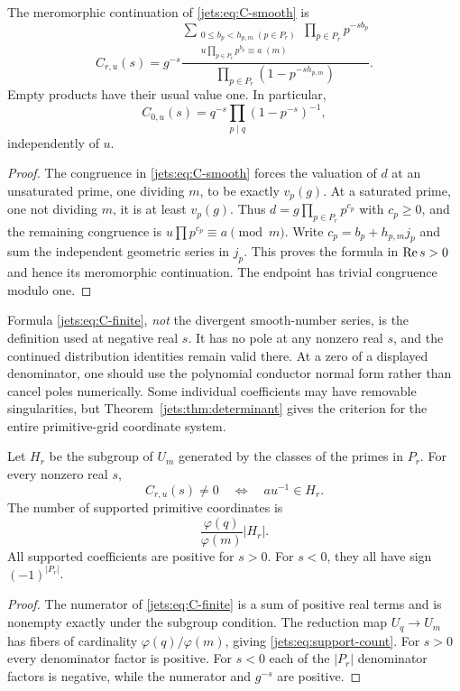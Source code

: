 \begin{theorem}\label{jets:thm:finite-C}
The meromorphic continuation of \eqref{jets:eq:C-smooth} is
\begin{equation}\label{jets:eq:C-finite}
 C_{r,u}(s)=g^{-s}
 \frac{\displaystyle
 \sum_{\substack{0\le b_p<h_{p,m}\;(p\in P_r)\\
 u\prod_{p\in P_r}p^{b_p}\equiv a\;(m)}}
 \prod_{p\in P_r}p^{-s b_p}}
 {\displaystyle\prod_{p\in P_r}(1-p^{-s h_{p,m}})}.
\end{equation}
Empty products have their usual value one. In particular,
\begin{equation}\label{jets:eq:C-endpoint}
 C_{0,u}(s)=q^{-s}\prod_{p\mid q}(1-p^{-s})^{-1},
\end{equation}
independently of $u$.
\end{theorem}
\begin{proof}
The congruence in \eqref{jets:eq:C-smooth} forces the valuation of $d$ at
an unsaturated prime, one dividing $m$, to be exactly $v_p(g)$.
At a saturated prime, one not dividing $m$, it is at least $v_p(g)$.
Thus $d=g\prod_{p\in P_r}p^{c_p}$ with $c_p\ge0$, and the remaining
congruence is $u\prod p^{c_p}\equiv a\pmod m$.
Write $c_p=b_p+h_{p,m}j_p$ and sum the independent geometric series in
$j_p$. This proves the formula in $\operatorname{Re} s>0$ and hence its meromorphic
continuation. The endpoint has trivial congruence modulo one.
\end{proof}

Formula \eqref{jets:eq:C-finite}, \emph{not} the divergent smooth-number
series, is the definition used at negative real $s$. It has no pole at
any nonzero real $s$, and the continued distribution identities remain
valid there. At a zero of a displayed denominator, one should use the
polynomial conductor normal form rather than cancel poles numerically.
Some individual coefficients may have removable singularities, but
Theorem~\ref{jets:thm:determinant} gives the criterion for the entire
primitive-grid coordinate system.

\begin{corollary}\label{jets:cor:support}
Let $H_r$ be the subgroup of $U_m$ generated by the classes of the
primes in $P_r$. For every nonzero real $s$,
\[
 C_{r,u}(s)\ne0\quad\Longleftrightarrow\quad au^{-1}\in H_r.
\]
The number of supported primitive coordinates is
\begin{equation}\label{jets:eq:support-count}
 \frac{\varphi(q)}{\varphi(m)}|H_r|.
\end{equation}
All supported coefficients are positive for $s>0$. For $s<0$, they
all have sign $(-1)^{|P_r|}$.
\end{corollary}
\begin{proof}
The numerator of \eqref{jets:eq:C-finite} is a sum of positive real terms
and is nonempty exactly under the subgroup condition. The reduction
map $U_q\to U_m$ has fibers of cardinality
$\varphi(q)/\varphi(m)$, giving \eqref{jets:eq:support-count}.
For $s>0$ every denominator factor is positive. For $s<0$ each of the
$|P_r|$ denominator factors is negative, while the numerator and
$g^{-s}$ are positive.
\end{proof}

